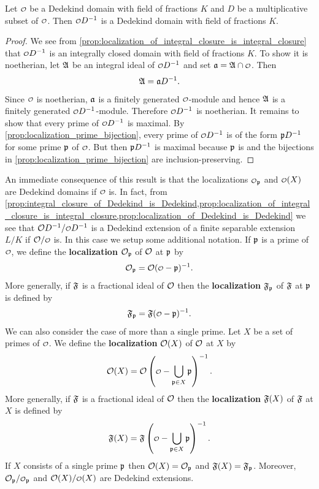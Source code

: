     \begin{proposition}\label{prop:localization_of_Dedekind_is_Dedekind}
      Let \(\smc{O}\) be a Dedekind domain with field of fractions \(K\) and \(D\) be a multiplicative subset of \(\smc{O}\). Then \(\smc{O}D^{-1}\) is a Dedekind domain with field of fractions \(K\).
    \end{proposition}
    \begin{proof}
      We see from \cref{prop:localization_of_integral_closure_is_integral_closure} that \(\smc{O}D^{-1}\) is an integrally closed domain with field of fractions \(K\). To show it is noetherian, let \(\mathfrak{A}\) be an integral ideal of \(\smc{O}D^{-1}\) and set \(\mf{a} = \mf{A} \cap \smc{O}\). Then
      \[
        \mathfrak{A} = \mathfrak{a}D^{-1}.
      \]
      Since \(\smc{O}\) is noetherian, \(\mathfrak{a}\) is a finitely generated \(\smc{O}\)-module and hence \(\mathfrak{A}\) is a finitely generated \(\smc{O}D^{-1}\)-module. Therefore \(\smc{O}D^{-1}\) is noetherian. It remains to show that every prime of \(\smc{O}D^{-1}\) is maximal. By \cref{prop:localization_prime_bijection}, every prime of \(\smc{O}D^{-1}\) is of the form \(\mathfrak{p}D^{-1}\) for some prime \(\mathfrak{p}\) of \(\smc{O}\). But then \(\mathfrak{p}D^{-1}\) is maximal because \(\mathfrak{p}\) is and the bijections in \cref{prop:localization_prime_bijection} are inclusion-preserving.
    \end{proof}

    An immediate consequence of this result is that the localizations \(\smc{O}_{\mf{p}}\) and \(\smc{O}(X)\) are Dedekind domains if \(\smc{O}\) is. In fact, from \cref{prop:integral_closure_of_Dedekind_is_Dedekind,prop:localization_of_integral_closure_is_integral_closure,prop:localization_of_Dedekind_is_Dedekind} we see that \(\mc{O}D^{-1}/\smc{O}D^{-1}\) is a Dedekind extension of a finite separable extension \(L/K\) if \(\mc{O}/\smc{O}\) is. In this case we setup some additional notation. If \(\mathfrak{p}\) is a prime of \(\smc{O}\), we define the \textbf{localization} \(\mathcal{O}_{\mathfrak{p}}\) of \(\mathcal{O}\) at \(\mathfrak{p}\) by
    \[
      \mc{O}_{\mf{p}} = \mc{O}(\smc{O}-\mf{p})^{-1}.
    \]
    More generally, if \(\mathfrak{F}\) is a fractional ideal of \(\mathcal{O}\) then the \textbf{localization} \(\mathfrak{F}_{\mathfrak{p}}\) of \(\mathfrak{F}\) at \(\mathfrak{p}\) is defined by
    \[
      \mf{F}_{\mf{p}} = \mf{F}(\smc{O}-\mf{p})^{-1}.
    \]
    We can also consider the case of more than a single prime. Let \(X\) be a set of primes of \(\smc{O}\). We define the \textbf{localization} \(\mathcal{O}(X)\) of \(\mathcal{O}\) at \(X\) by
    \[
      \mc{O}(X) = \mc{O}\left(\smc{O}-\bigcup_{\mf{p} \in X}\mf{p}\right)^{-1}.
    \]
    More generally, if \(\mathfrak{F}\) is a fractional ideal of \(\mathcal{O}\) then the \textbf{localization} \(\mathfrak{F}(X)\) of \(\mathfrak{F}\) at \(X\) is defined by
    \[
      \mf{F}(X) = \mf{F}\left(\smc{O}-\bigcup_{\mf{p} \in X}\mf{p}\right)^{-1}.
    \]
    If \(X\) consists of a single prime \(\mathfrak{p}\) then \(\mathcal{O}(X) = \mathcal{O}_{\mathfrak{p}}\) and \(\mathfrak{F}(X) = \mathfrak{F}_{\mathfrak{p}}\). Moreover, \(\mc{O}_{\mf{p}}/\smc{O}_{\mf{p}}\) and \(\mc{O}(X)/\smc{O}(X)\) are Dedekind extensions.
    
